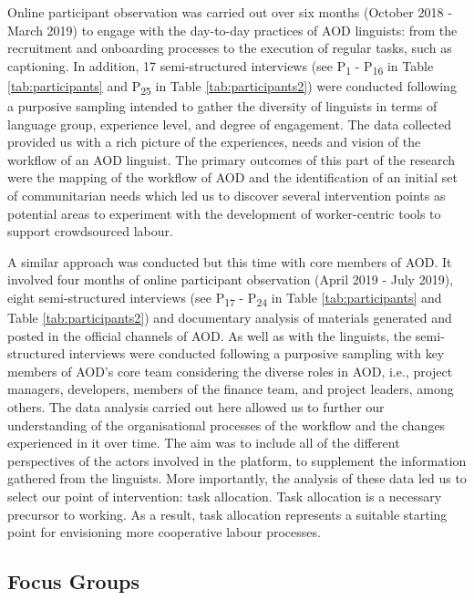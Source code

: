 Online participant observation was carried out over six months (October 2018 - March 2019) to engage with the day-to-day practices of AOD linguists: from the recruitment and onboarding processes to the execution of regular tasks, such as captioning. In addition, 17 semi-structured interviews (see P\textsubscript{1} - P\textsubscript{16} in Table \ref{tab:participants} and P\textsubscript{25} in Table \ref{tab:participants2}) were conducted following a purposive sampling \cite{palys2008purposive} intended to gather the diversity of linguists in terms of language group, experience level, and degree of engagement. The data collected provided us with a rich picture of the experiences, needs and vision of the workflow of an %
AOD linguist. The primary outcomes of this part of the research were the mapping of the workflow of AOD and the identification of an initial set of communitarian needs which led us to discover several intervention points as potential areas to experiment with the development of worker-centric tools to support crowdsourced labour.

A similar approach was conducted but this time with core members of AOD. It involved four months of online participant observation (April 2019 - July 2019), eight semi-structured interviews (see P\textsubscript{17} - P\textsubscript{24} in Table \ref{tab:participants} and Table \ref{tab:participants2}) and documentary analysis of materials generated and posted in the official channels of AOD. As well as with the linguists, the semi-structured interviews were conducted following a purposive sampling \cite{palys2008purposive} with key members of AOD's core team considering the diverse roles in AOD, i.e., project managers, developers, members of the finance team, and project leaders, among others. The data analysis carried out here allowed us to further our understanding of the organisational processes of the workflow and the changes experienced in it over time. The aim was to include all of the different perspectives of the actors involved in the platform, to supplement the information gathered from the linguists. More importantly, the analysis of these data led us to select our point of intervention: task allocation. Task allocation is a necessary precursor to working. As a result, task allocation represents a suitable starting point for envisioning more cooperative labour processes.

\subsection{Focus Groups}


